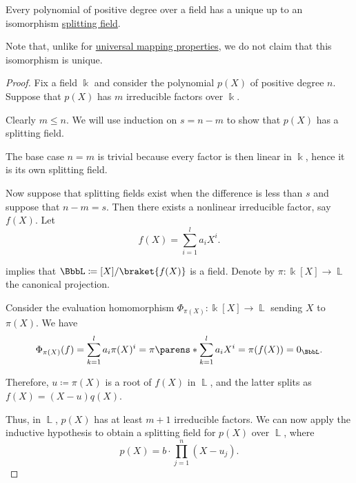 \begin{proposition}\label{thm:splitting_field_existence}
  Every polynomial of positive degree over a field has a unique up to an isomorphism \hyperref[def:splitting_field]{splitting field}.
\end{proposition}
\begin{comments}
  \item Note that, unlike for \hyperref[rem:universal_mapping_property]{universal mapping properties}, we do not claim that this isomorphism is unique.
\end{comments}
\begin{proof}
  \ExistenceSubProof{} Fix a field \( \Bbbk \) and consider the polynomial \( p(X) \) of positive degree \( n \). Suppose that \( p(X) \) has \( m \) irreducible factors over \( \Bbbk \).

  Clearly \( m \leq n \). We will use induction on \( s = n - m \) to show that \( p(X) \) has a splitting field.

  The base case \( n = m \) is trivial because every factor is then linear in \( \Bbbk \), hence it is its own splitting field.

  Now suppose that splitting fields exist when the difference is less than \( s \) and suppose that \( n - m = s \). Then there exists a nonlinear irreducible factor, say \( f(X) \). Let
  \begin{equation*}
    f(X) = \sum_{i=1}^l a_i X^i.
  \end{equation*}

   implies that \( \BbbL \coloneqq \Bbbk[X] / \braket{ f(X) } \) is a field. Denote by \( \pi: \Bbbk[X] \to \BbbL \) the canonical projection.

  Consider the evaluation homomorphism \( \Phi_{\pi(X)}: \Bbbk[X] \to \BbbL \) sending \( X \) to \( \pi(X) \). We have
  \begin{equation*}
    \Phi_{\pi(X)}(f) = \sum_{k=1}^l a_i \pi(X)^i = \pi\parens*{ \sum_{k=1}^l a_i X^i } = \pi(f(X)) = 0_\BbbL.
  \end{equation*}

  Therefore, \( u \coloneqq \pi(X) \) is a root of \( f(X) \) in \( \BbbL \), and the latter splits as \( f(X) = (X - u) q(X) \).

  Thus, in \( \BbbL \), \( p(X) \) has at least \( m + 1 \) irreducible factors. We can now apply the inductive hypothesis to obtain a splitting field for \( p(X) \) over \( \BbbL \), where
  \begin{equation*}
    p(X) = b \cdot \prod_{j=1}^n (X - u_j).
  \end{equation*}


\end{proof}

